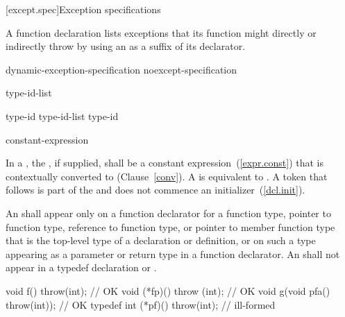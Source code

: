 [except.spec]{Exception specifications}%

\pnum
A function declaration lists exceptions
that its function might directly or indirectly throw
by using an
as a suffix of its declarator.

\begin{bnf}
\br
    dynamic-exception-specification\br
    noexcept-specification
\end{bnf}

\begin{bnf}
\br
     type-id-list\opt \terminal{)}
\end{bnf}

\begin{bnf}
\br
    type-id \opt\br
    type-id-list \terminal{,} type-id \opt
\end{bnf}

\begin{bnf}
\br
     \terminal{(} constant-expression \terminal{)}\br
\end{bnf}

%
In a , the ,
if supplied, shall be a constant expression~(\ref{expr.const}) that is contextually
converted to  (Clause~\ref{conv}). A 
 is equivalent to .
A \tcode{(} token that follows  is part of the
 and does not commence an
initializer~(\ref{dcl.init}).

\pnum
An
shall appear only on a function declarator for a function type,
pointer to function type, reference to function type, or pointer to
member function type that is the top-level type of a declaration or
definition, or on such a type appearing as a parameter or return type
in a function declarator.
An
shall not appear in a typedef declaration or .
\enterexample
\begin{codeblock}
void f() throw(int);                    // OK
void (*fp)() throw (int);               // OK
void g(void pfa() throw(int));          // OK
typedef int (*pf)() throw(int);         // ill-formed
\end{codeblock}

